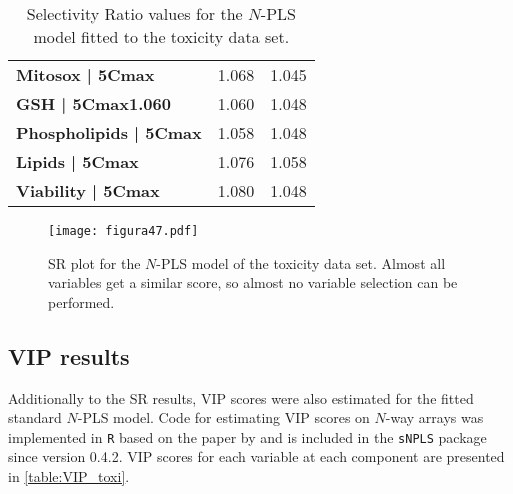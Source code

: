 \begin{table}[hbtp]
{\begin{tabular}{lcc}
\textbf{Mitosox | 5Cmax}         & 1.068                & 1.045                \\
\textbf{GSH | 5Cmax1.060}        & 1.060                & 1.048                \\
\textbf{Phospholipids | 5Cmax}   & 1.058                & 1.048                \\
\textbf{Lipids | 5Cmax}          & 1.076                & 1.058                \\
\textbf{Viability | 5Cmax}       & 1.080                & 1.048                \\ \hline
\end{tabular}}
\caption{Selectivity Ratio values for the $N$-PLS model fitted to the toxicity data set.}
\label{table:SR_toxi}
\end{table}


\begin{figure}[hbtp]
	\centering
\texttt{[image: figura47.pdf]}
\caption[SR plot for the $N$-PLS model of the toxicity data set]{SR plot for the $N$-PLS model of the toxicity data set. Almost all variables get a similar score, so almost no variable selection can be performed.}
\label{figura47}
\end{figure}

\subsection{VIP results}
Additionally to the SR results, VIP scores were also estimated for the fitted standard $N$-PLS model. Code for estimating VIP scores on $N$-way arrays was implemented in \texttt{R} based on the paper by \textcite{favilla2013assessing} and is included in the \texttt{sNPLS} package since version 0.4.2. VIP scores for each variable at each component are presented in \autoref{table:VIP_toxi}.

\vspace{10pt}

